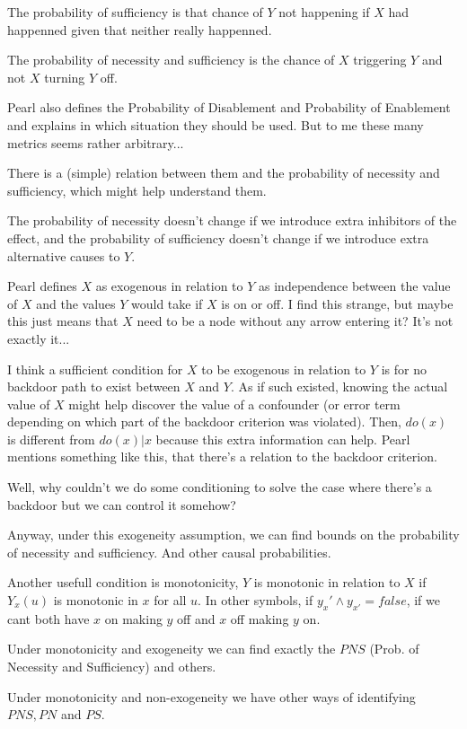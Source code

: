 The probability of sufficiency is that chance of $Y$ not happening if $X$ had happenned given that neither really happenned.

The probability of necessity and sufficiency is the chance of $X$ triggering $Y$ and not $X$ turning $Y$ off.

Pearl also defines the Probability of Disablement and Probability of Enablement and explains in which situation they should be used. But to me these many metrics seems rather arbitrary... 

There is a (simple) relation between them and the probability of necessity and sufficiency, which might help understand them.

The probability of necessity doesn't change if we introduce extra inhibitors of the effect, and the probability of sufficiency doesn't change if we introduce extra alternative causes to $Y$.

Pearl defines $X$ as exogenous in relation to $Y$ as independence between the value of $X$ and the values $Y$ would take if $X$ is on or off. I find this strange, but maybe this just means that $X$ need to be a node without any arrow entering it? It's not exactly it...

I think a sufficient condition for $X$ to be exogenous in relation to $Y$ is for no backdoor path to exist between $X$ and $Y$. As if such existed, knowing the actual value of $X$ might help discover the value of a confounder (or error term depending on which part of the backdoor criterion was violated). Then, $do(x)$ is different from $do(x)|x$ because this extra information can help. Pearl mentions something like this, that there's a relation to the backdoor criterion.

Well, why couldn't we do some conditioning to solve the case where there's a backdoor but we can control it somehow?

Anyway, under this exogeneity assumption, we can find bounds on the probability of necessity and sufficiency. And other causal probabilities.

Another usefull condition is monotonicity, $Y$ is monotonic in relation to $X$ if $Y_x(u)$ is monotonic in $x$ for all $u$. In other symbols, if $y_x' \land y_{x'} = false$, if we cant both have $x$ on making $y$ off and $x$ off making $y$ on.

Under monotonicity and exogeneity we can find exactly the $PNS$ (Prob. of Necessity and Sufficiency) and others.

Under monotonicity and non-exogeneity we have other ways of identifying $PNS,PN$ and $PS$.


